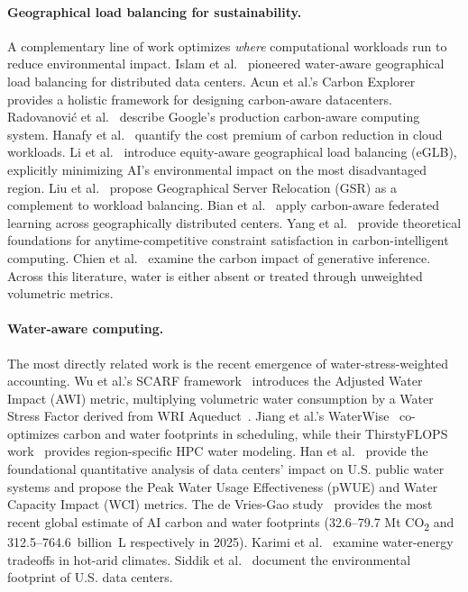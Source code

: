 \documentclass[conference,10pt]{IEEEtran}
\begin{document}
\paragraph{Geographical load balancing for sustainability.}
A complementary line of work optimizes \emph{where} computational
workloads run to reduce environmental impact. Islam et
al.~\cite{islam2018water} pioneered water-aware geographical load
balancing for distributed data centers. Acun et al.'s Carbon
Explorer~\cite{acun2023carbon} provides a holistic framework for
designing carbon-aware datacenters. Radovanovi\'{c} et
al.~\cite{radovanovic2023carbon} describe Google's production
carbon-aware computing system. Hanafy et al.~\cite{hanafy2024going}
quantify the cost premium of carbon reduction in cloud workloads. Li et
al.~\cite{li2024equitable} introduce equity-aware geographical load
balancing (eGLB), explicitly minimizing AI's environmental impact on
the most disadvantaged region. Liu et al.~\cite{liu2024gsr} propose
Geographical Server Relocation (GSR) as a complement to workload
balancing. Bian et al.~\cite{bian2024cafe} apply carbon-aware federated
learning across geographically distributed centers. Yang et
al.~\cite{yang2023acrl} provide theoretical foundations for
anytime-competitive constraint satisfaction in carbon-intelligent
computing. Chien et al.~\cite{chien2023reducing} examine the carbon
impact of generative inference. Across this literature, water is either
absent or treated through unweighted volumetric metrics.

\paragraph{Water-aware computing.}
The most directly related work is the recent emergence of
water-stress-weighted accounting. Wu et al.'s SCARF
framework~\cite{wu2025scarf} introduces the Adjusted Water Impact (AWI)
metric, multiplying volumetric water consumption by a Water Stress
Factor derived from WRI Aqueduct~\cite{kuzma2023aqueduct}. Jiang et
al.'s WaterWise~\cite{jiang2025waterwise} co-optimizes carbon and water
footprints in scheduling, while their ThirstyFLOPS
work~\cite{jiang2025thirsty} provides region-specific HPC water
modeling. Han et al.~\cite{han2026} provide the foundational
quantitative analysis of data centers' impact on U.S. public water
systems and propose the Peak Water Usage Effectiveness (pWUE) and Water
Capacity Impact (WCI) metrics. The de Vries-Gao
study~\cite{devries2026} provides the most recent global estimate of AI
carbon and water footprints (32.6--79.7 Mt CO\textsubscript{2} and
312.5--764.6~billion~L respectively in 2025). Karimi et
al.~\cite{karimi2022water} examine water-energy tradeoffs in hot-arid
climates. Siddik et al.~\cite{siddik2021environmental} document the
environmental footprint of U.S. data centers.
\end{document}
